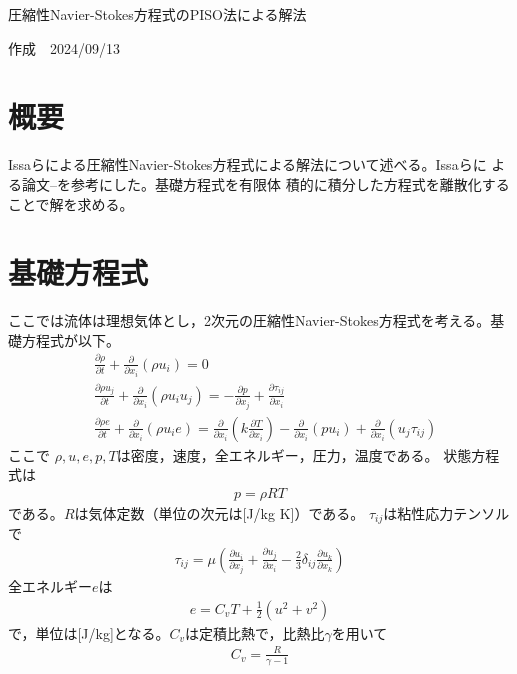 \documentclass[a4paper,10pt,fleqn,dvipdfmx]{jsarticle}
\begin{document}

\begin{flushleft}
\begin{Large}
圧縮性Navier-Stokes方程式のPISO法による解法
\end{Large}
\end{flushleft}

\begin{flushright}
作成　2024/09/13\\
\end{flushright}

\section{概要}
Issaらによる圧縮性Navier-Stokes方程式による解法について述べる。Issaらに
よる論文\cite{Issa1991}--\cite{Issa1986}を参考にした。基礎方程式を有限体
積的に積分した方程式を離散化することで解を求める。

\section{基礎方程式}
ここでは流体は理想気体とし，2次元の圧縮性Navier-Stokes方程式を考える。基礎方程式が以下。
\begin{align}
& \frac{\partial \rho}{\partial t} + \frac{\partial}{\partial x_i}(\rho
 u_i) = 0 \label{eq:mass0}\\
& \frac{\partial \rho u_j}{\partial t} + \frac{\partial}{\partial x_i}(\rho
 u_i u_j) = -\frac{\partial p}{\partial x_j} + \frac{\partial
 \tau_{ij}}{\partial x_i} \label{eq:mom0}\\
& \frac{\partial \rho e}{\partial t} + \frac{\partial}{\partial x_i}(\rho
 u_i e) = \frac{\partial}{\partial x_i}\left(k\frac{\partial T}{\partial
 x_i}\right) - \frac{\partial}{\partial x_i}(pu_i) +
 \frac{\partial}{\partial x_i}(u_j \tau_{ij}) \label{eq:en0}
\end{align}
ここで
$\rho, u, e, p, T$は密度，速度，全エネルギー，圧力，温度である。
状態方程式は
\begin{align}
 p=\rho RT
\end{align}
である。$R$は気体定数（単位の次元は[J/kg K]）である。
$\tau_{ij}$は粘性応力テンソルで
\begin{align}
 \tau_{ij} = \mu\left(\frac{\partial u_i}{\partial x_j} + \frac{\partial
 u_j}{\partial x_i} -\frac{2}{3}\delta_{ij}\frac{\partial u_k}{\partial x_k}\right)
\end{align}
全エネルギー$e$は
\begin{align}
 e=C_vT+\frac{1}{2}(u^2+v^2)
\end{align}
で，単位は[J/kg]となる。$C_v$は定積比熱で，比熱比$\gamma$を用いて
\begin{align}
 C_v=\frac{R}{\gamma-1}
\end{align}
\end{document}
